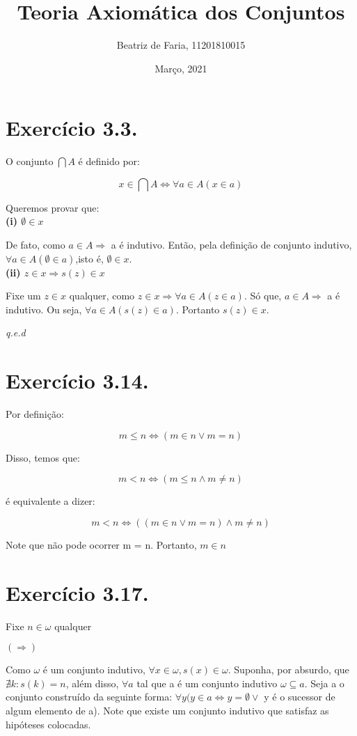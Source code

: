 \documentclass[12pt]{extarticle}
\title{Teoria Axiomática dos Conjuntos}
\author{Beatriz de Faria, 11201810015}
\date{Março, 2021}
\newcommand{\fim}{\begin{flushright}

   \emph{q.e.d}
\end{flushright}}
\begin{document}
\maketitle

\section{Exercício 3.3.}

O conjunto $\bigcap A$ é definido por:

$$
x \in \bigcap A \Leftrightarrow \forall a \in A (x \in a)
$$

Queremos provar que:\\

\textbf{(i) $\emptyset \in x$}

De fato, como $ a \in A \Rightarrow$ a é indutivo. Então, pela definição de conjunto indutivo, $\forall a \in A (\emptyset \in a)$,isto é, $\emptyset \in x$. \\

\textbf{(ii) $z \in x \Rightarrow s(z) \in x$}

Fixe um $z \in x$ qualquer, como $z \in x \Rightarrow \forall a \in A (z \in a).$ Só que, $ a \in A \Rightarrow$ a é indutivo. Ou seja, $\forall a \in A (s(z) \in a)$. Portanto $s(z) \in x$.

\fim

\section{Exercício 3.14.}

Por definição:

$$
m \leq n \Leftrightarrow (m \in n \lor m = n)
$$

Disso, temos que:

$$
m < n \Leftrightarrow (m \leq n \land m \neq n)
$$

é equivalente a dizer:

$$
m < n \Leftrightarrow ((m \in n \lor m = n) \land m \neq n)
$$

Note que não pode ocorrer m = n. Portanto, $m \in n$

\section{Exercício 3.17.}

Fixe $n \in \omega$ qualquer

$(\Rightarrow)$ 

Como $\omega$ é um conjunto indutivo, $\forall x \in \omega, s(x) \in \omega$. Suponha, por absurdo, que $\nexists k : s(k) = n$, além disso, $\forall a$ tal que a é um conjunto indutivo $\omega \subseteq a$. Seja a o conjunto construído da seguinte forma: $\forall y (y \in a \Leftrightarrow y = \emptyset \lor$ y é o sucessor de algum elemento de a). Note que existe um conjunto indutivo que satisfaz as hipóteses colocadas. 
\end{document}
